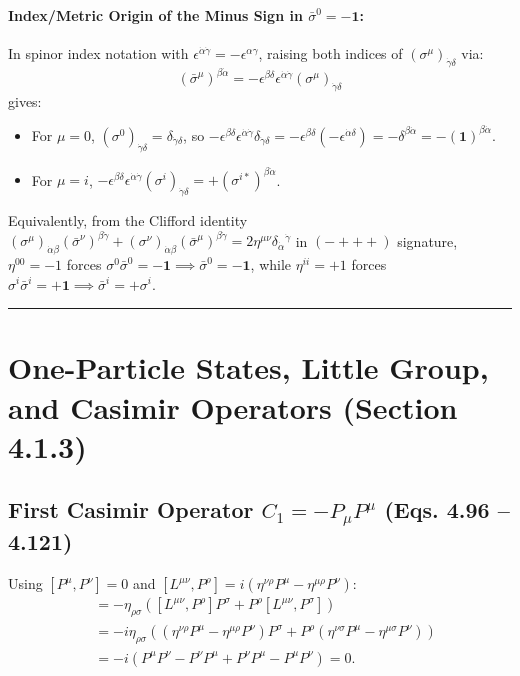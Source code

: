 \documentclass[11pt,a4paper]{article}
\begin{document}
\paragraph{Index/Metric Origin of the Minus Sign in $\bar{\sigma}^0 = -\mathbf{1}$:}
In spinor index notation with $\epsilon^{\dot{\alpha}\dot{\gamma}} = -\epsilon^{\alpha\gamma}$, raising both indices of $(\sigma^\mu)_{\dot{\gamma}\delta}$ via:
\begin{equation}
    (\bar{\sigma}^\mu)^{\beta\dot{\alpha}} = -\epsilon^{\beta\delta}\epsilon^{\dot{\alpha}\dot{\gamma}}(\sigma^\mu)_{\dot{\gamma}\delta}
\end{equation}
gives:
\begin{itemize}
    \item For $\mu=0$, $(\sigma^0)_{\dot{\gamma}\delta} = \delta_{\dot{\gamma}\delta}$, so $-\epsilon^{\beta\delta}\epsilon^{\dot{\alpha}\dot{\gamma}}\delta_{\dot{\gamma}\delta} = -\epsilon^{\beta\delta}(-\epsilon^{\dot{\alpha}\delta}) = -\delta^{\beta\dot{\alpha}} = -(\mathbf{1})^{\beta\dot{\alpha}}$.
    \item For $\mu=i$, $-\epsilon^{\beta\delta}\epsilon^{\dot{\alpha}\dot{\gamma}}(\sigma^i)_{\dot{\gamma}\delta} = +(\sigma^{i*})^{\beta\dot{\alpha}}$.
\end{itemize}
Equivalently, from the Clifford identity $(\sigma^\mu)_{\dot{\alpha}\beta}(\bar{\sigma}^\nu)^{\beta\dot{\gamma}} + (\sigma^\nu)_{\dot{\alpha}\beta}(\bar{\sigma}^\mu)^{\beta\dot{\gamma}} = 2\eta^{\mu\nu}\delta_{\dot{\alpha}}{}^{\dot{\gamma}}$ in $(-+++)$ signature, $\eta^{00} = -1$ forces $\sigma^0 \bar{\sigma}^0 = -\mathbf{1} \implies \bar{\sigma}^0 = -\mathbf{1}$, while $\eta^{ii} = +1$ forces $\sigma^i \bar{\sigma}^i = +\mathbf{1} \implies \bar{\sigma}^i = +\sigma^i$.

\vspace{0.5em}\hrule\vspace{1em}

\section{One-Particle States, Little Group, and Casimir Operators (Section 4.1.3)}

\subsection{First Casimir Operator $C_1 = -P_\mu P^\mu$ (Eqs. 4.96 -- 4.121)}
Using $[P^\mu, P^\nu] = 0$ and $[L^{\mu\nu}, P^\rho] = i(\eta^{\nu\rho}P^\mu - \eta^{\mu\rho}P^\nu)$:
\begin{align}
    [L^{\mu\nu}, -P_\rho P^\rho] &= -\eta_{\rho\sigma}\left([L^{\mu\nu}, P^\rho]P^\sigma + P^\rho[L^{\mu\nu}, P^\sigma]\right) \nonumber \\
    &= -i\eta_{\rho\sigma}\left((\eta^{\nu\rho}P^\mu - \eta^{\mu\rho}P^\nu)P^\sigma + P^\rho(\eta^{\nu\sigma}P^\mu - \eta^{\mu\sigma}P^\nu)\right) \nonumber \\
    &= -i\left(P^\mu P^\nu - P^\nu P^\mu + P^\nu P^\mu - P^\mu P^\nu\right) = 0.
\end{align}
\end{document}
